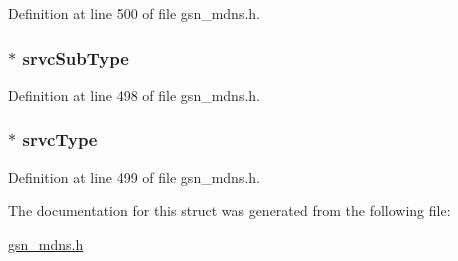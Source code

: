 Definition at line 500 of file gsn\_\-mdns.h.

\hypertarget{a00148_a4e61cdbf2eafc75c79bcde6e6c7677f5}{
\subsubsection[{srvcSubType}]{$\ast$ {\bf srvcSubType}}}
\label{a00148_a4e61cdbf2eafc75c79bcde6e6c7677f5}


Definition at line 498 of file gsn\_\-mdns.h.

\hypertarget{a00148_a2e752067434e761ea83939d19aa930fe}{
\subsubsection[{srvcType}]{$\ast$ {\bf srvcType}}}
\label{a00148_a2e752067434e761ea83939d19aa930fe}


Definition at line 499 of file gsn\_\-mdns.h.



The documentation for this struct was generated from the following file:\begin{DoxyCompactItemize}
\item 
\hyperlink{a00526}{gsn\_\-mdns.h}\end{DoxyCompactItemize}
